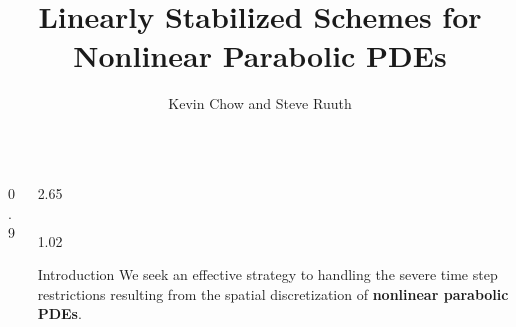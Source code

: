 \documentclass[]{beamer} %
\title{Linearly Stabilized Schemes for Nonlinear Parabolic PDEs } %
\author{Kevin Chow and Steve Ruuth} %
\institute{Department of Mathematics, Simon Fraser University} %
\newlength{\sepwid}
\newlength{\onecolwid}
\newcommand{\bR}{\mathbb{R}}
\begin{document}
	
	\setlength{\belowcaptionskip}{2ex} %
	\setlength\belowdisplayshortskip{2ex} %
	\begin{frame}[t] %
		\begin{columns}[t] %
			\begin{column}{0.9\sepwid}\end{column} %
			\begin{column}{2.65\onecolwid}  %
				\begin{columns}[t,totalwidth=2.55\onecolwid]%
					\begin{column}{1.02\onecolwid}\vspace{-0.8in}%
						\begin{block}{Introduction} %
							We seek an effective strategy to handling the severe time step restrictions resulting from the spatial discretization of \textbf{nonlinear parabolic PDEs}. 
							

\end{block}
\end{column}
\end{columns}
\end{column}
\end{columns}
\end{frame}
\end{document}
